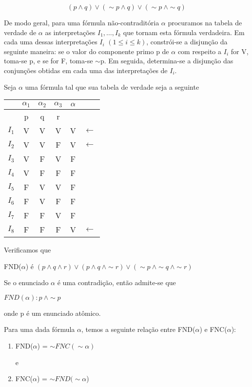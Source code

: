 $$(p \land q) \lor (\sim p \land q) \lor (\sim p\ \land \sim q)$$

De modo geral, para uma fórmula não-contraditória $\alpha$ procuramos na tabela de verdade de $\alpha$ as interpretações $I_1, \dots, I_k$ que tornam esta fórmula verdadeira.
Em cada uma dessas interpretações $I_i$ $(1 \leq i \leq k)$, constrói-se a disjunção da seguinte maneira: se o valor do componente primo p de $\alpha$ com respeito a $I_i$ for V, toma-se p, e se for F, toma-se $\sim$p.
Em seguida, determina-se a disjunção das conjunções obtidas em cada uma das interpretações de $I_i$.

\begin{exemplo}
    Seja $\alpha$ uma fórmula tal que sua tabela de verdade seja a seguinte
\end{exemplo}

\begin{tabular}{c | c c c c l}
    & $\alpha_1$ & $\alpha_2$ & $\alpha_3$ & $\alpha$ & \\ \hline
    & p & q & r & & \\
    $I_1$ & V & V & V & V & $\longleftarrow$ \\
    $I_2$ & V & V & F & V & $\longleftarrow$ \\
    $I_3$ & V & F & V & F & \\
    $I_4$ & V & F & F & F & \\
    $I_5$ & F & V & V & F & \\
    $I_6$ & F & V & F & F & \\
    $I_7$ & F & F & V & F & \\
    $I_8$ & F & F & F & V & $\longleftarrow$
\end{tabular}
\bigskip

Verificamos que

FND($\alpha$) é $(p \land q \land r) \lor (p \land q\ \land \sim r) \lor (\sim p\ \land \sim q\ \land \sim r)$

\noindent Se o enunciado $\alpha$ é uma contradição, então admite-se que

\centerline{$FND(\alpha)\colon p\ \land \sim p$}

\noindent onde p é um enunciado atômico.

Para uma dada fórmula $\alpha$, temos a seguinte relação entre FND($\alpha$) e FNC($\alpha$):

\begin{enumerate}[label=\roman*)]
    \item FND($\alpha$) = $\sim FNC(\sim \alpha)$

    e

    \item FNC($\alpha$) = $\sim FND(\sim \alpha$)
\end{enumerate}

